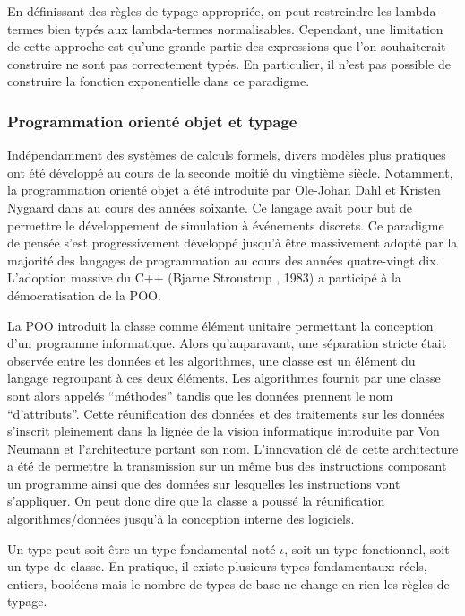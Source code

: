 En définissant des règles de typage appropriée, on peut restreindre
les lambda-termes bien typés aux lambda-termes
normalisables. Cependant, une limitation de cette approche est qu'une
grande partie des expressions que l'on souhaiterait construire ne sont
pas correctement typés. En particulier, il n'est pas possible de
construire la fonction exponentielle dans ce paradigme.


\subsubsection{Programmation orienté objet et typage}

Indépendamment des systèmes de calculs formels, divers modèles plus
pratiques ont été développé au cours de la seconde moitié du vingtième
siècle. Notamment, la programmation orienté objet  a été introduite par Ole-Johan Dahl  et Kristen Nygaard  dans  au cours des années soixante. Ce langage avait pour but de
permettre le développement de simulation à événements discrets. Ce
paradigme de pensée s'est progressivement développé jusqu'à être
massivement adopté par la majorité des langages de programmation au
cours des années quatre-vingt dix. L'adoption massive du C++ (Bjarne
Stroustrup , 1983) a participé à la
démocratisation de la POO.


La POO introduit la classe comme élément unitaire permettant la
conception d'un programme informatique. Alors qu'auparavant, une
séparation stricte était observée entre les données et les
algorithmes, une classe est un élément du langage regroupant à ces
deux éléments. Les algorithmes fournit par une classe sont alors
appelés ``méthodes'' tandis que les données prennent le nom
``d'attributs''. Cette réunification des données et des traitements
sur les données s'inscrit pleinement dans la lignée de la vision
informatique introduite par Von Neumann et l'architecture portant son
nom. L'innovation clé de cette architecture a été de permettre la
transmission sur un même bus des instructions composant un programme
ainsi que des données sur lesquelles les instructions vont
s'appliquer. On peut donc dire que la classe a poussé la réunification
algorithmes/données jusqu'à la conception interne des logiciels.

\begin{mydef}\label{def:chap1_type}
  Un type peut soit être un type fondamental noté $\iota$, soit un
  type fonctionnel, soit un type de classe. En pratique, il existe
  plusieurs types fondamentaux: réels, entiers, booléens mais le
  nombre de types de base ne change en rien les règles de typage.
\end{mydef}

